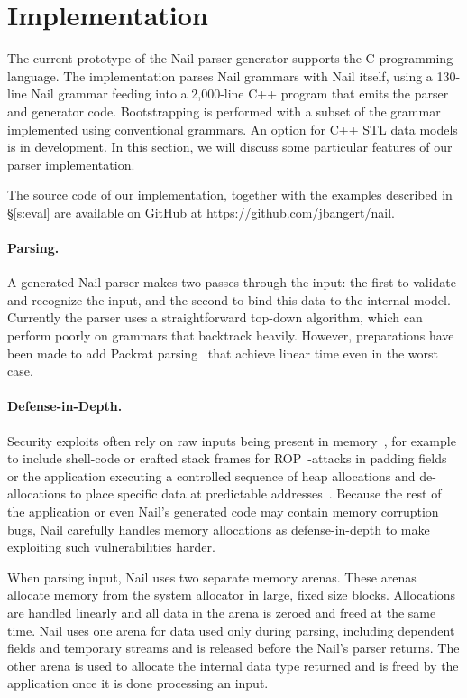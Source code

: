 \section{Implementation}
\label{s:impl}

The current prototype of the Nail parser generator supports the C programming
language. The implementation parses Nail grammars with Nail itself, using a
130-line Nail grammar feeding into a 2,000-line C++ program that
emits the parser and generator code. Bootstrapping is
performed with a subset of the grammar implemented using conventional grammars. 
An option for C++ STL data models is in development. In
this section, we will discuss some particular features of our parser
implementation.

The source code of our implementation, together with the examples described in
\S\ref{s:eval} are available on GitHub at \url{https://github.com/jbangert/nail}.


\paragraph{Parsing.}

A generated Nail parser makes two passes through the input: the first to
validate and recognize the input, and the second to bind this data to the internal
model. Currently the parser uses a straightforward top-down algorithm, which can perform poorly on
grammars that backtrack heavily. However, preparations have been made to add Packrat
parsing~\cite{packrat-parsing:icfp02} that achieve linear time even in the worst case.

\paragraph{Defense-in-Depth.}

Security exploits often rely on raw inputs being present in memory~\cite{shotgun-parser}, for example to include
shell-code or crafted stack frames for ROP~\cite{phrack58:4-nergal}-attacks in padding fields or the
application executing a controlled sequence of heap allocations and de-allocations to place
specific data at predictable addresses~\cite{jp-advanced, vudo-malloc}. Because the rest of the
application or even Nail's generated code may contain memory corruption bugs, Nail
carefully handles memory allocations as defense-in-depth to make exploiting such vulnerabilities harder.

When parsing input, Nail uses two separate memory arenas. These arenas allocate memory from the
system allocator in large, fixed size blocks. Allocations are handled linearly and all data in the
arena is zeroed and freed at the same time. Nail uses one arena for data used only during parsing,
including dependent fields and temporary streams and is released before the Nail's parser returns.
The other arena is used to allocate the internal data type returned and is freed by the application
once it is done processing an input. 


